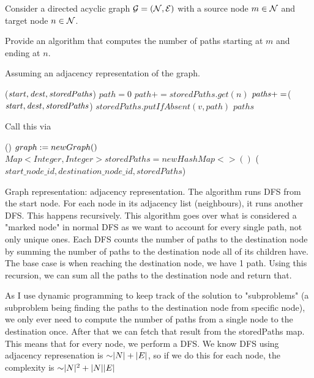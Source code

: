 \begin{problem}
Consider a directed acyclic graph $\mathcal{G} = (\mathcal{N}, \mathcal{E})$ with a source node $m \in \mathcal{N}$ and target node $n \in \mathcal{N}$.
\begin{questions}
\item Provide an algorithm that computes the number of paths starting at $m$ and ending at $n$.

Assuming an adjacency representation of the graph.

\begin{myalgo}{($\textit{start\/},\textit{dest\/},\textit{storedPaths\/}$)}
  \ENDIF
  \STATE $path = 0$
      \STATE $path += storedPaths.get(n)$
    \ELSE{}
      \STATE $\textit{paths\/} += $($\textit{start\/},\textit{dest\/},\textit{storedPaths\/}$)
    \ENDIF
  \ENDFOR
  \STATE $storedPaths.putIfAbsent(v, path)$
  \RETURN $paths$
\end{myalgo}

Call this via 

\begin{myalgo}{()}
  \STATE $graph := new Graph()$  
  \STATE $Map<Integer, Integer> storedPaths = new HashMap<>()$
  \PRINT {}($start\_node\_id,destination\_node\_id,storedPaths$)
\end{myalgo}

Graph representation: adjacency representation. The algorithm runs DFS from the start node. For each node in its adjacency list (neighbours), it runs another DFS. This happens recursively.
This algorithm goes over what is considered a "marked node" in normal DFS as we want to account for every single path, not only unique ones. Each DFS counts the number of paths to the destination node by summing the number of paths to the destination node all of its children have.
The base case is when reaching the destination node, we have 1 path. Using this recursion, we can sum all the paths to the destination node and return that.

As I use dynamic programming to keep track of the solution to "subproblems" (a subproblem being finding the paths to the destination node from specific node), we only ever need to compute the number of paths from a single node to the destination once. After that we can fetch that result from the storedPaths map.
This means that for every node, we perform a DFS. We know DFS using adjacency represenation is $\mathord{\sim}|N| + |E|$, so if we do this for each node, the complexity is $\mathord{\sim}|N|^2 + |N||E|$


\end{questions}
\end{problem}
